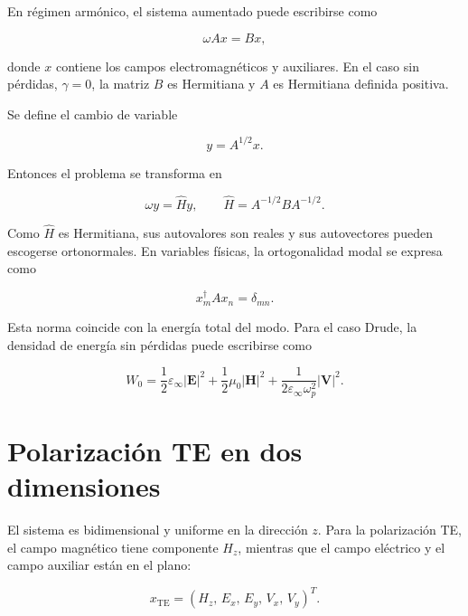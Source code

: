 \documentclass[11pt,a4paper]{article}
\newcommand{\epsinf}{\varepsilon_\infty}
\newcommand{\omegap}{\omega_p}
\newcommand{\vect}[1]{\bm{#1}}
\newcommand{\Hhat}{\widehat{H}}
\begin{document}
En régimen armónico, el sistema aumentado puede escribirse como

\begin{equation}
  \omega A x = Bx,
  \label{eq:generalized_evp}
\end{equation}

donde $x$ contiene los campos electromagnéticos y auxiliares. En el caso sin
pérdidas, $\gamma = 0$, la matriz $B$ es Hermitiana y $A$ es Hermitiana definida
positiva.

Se define el cambio de variable

\begin{equation}
  y = A^{1/2}x.
  \label{eq:y}
\end{equation}

Entonces el problema se transforma en

\begin{equation}
  \omega y = \Hhat y,
  \qquad
  \Hhat = A^{-1/2}BA^{-1/2}.
  \label{eq:hhat_problem}
\end{equation}

Como $\Hhat$ es Hermitiana, sus autovalores son reales y sus autovectores
pueden escogerse ortonormales. En variables físicas, la ortogonalidad modal se
expresa como

\begin{equation}
  x_m^\dagger A x_n = \delta_{mn}.
  \label{eq:orthogonality}
\end{equation}

Esta norma coincide con la energía total del modo. Para el caso Drude, la
densidad de energía sin pérdidas puede escribirse como

\begin{equation}
  W_0
  =
  \frac{1}{2}\epsinf |\vect{E}|^2
  +
  \frac{1}{2}\mu_0 |\vect{H}|^2
  +
  \frac{1}{2\epsinf\omegap^2}
  |\vect{V}|^2.
  \label{eq:energy}
\end{equation}

\section{Polarización TE en dos dimensiones}

El sistema es bidimensional y uniforme en la dirección $z$. Para la polarización
TE, el campo magnético tiene componente $H_z$, mientras que el campo eléctrico
y el campo auxiliar están en el plano:

\begin{equation}
  x_{\mathrm{TE}}
  =
  \left(
    H_z,\,
    E_x,\,
    E_y,\,
    V_x,\,
    V_y
  \right)^T.
  \label{eq:te_state}
\end{equation}
\end{document}
